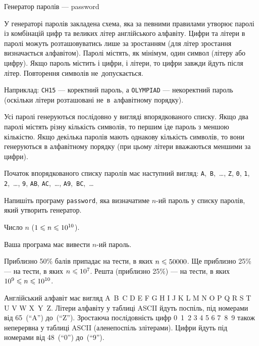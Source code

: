 \documentclass[14pt,a4paper]{extarticle}
\begin{document}
\begin{problemAllDefault}{Генератор паролів --- password}

У генераторі паролів закладена схема, яка за певними правилами утворює паролі із комбінацій цифр та великих літер англійського алфавіту. Цифри та літери в паролі можуть розташовуватись лише за зростанням (для літер зростання визначається алфавітом). Паролі містять, як мінімум, один символ (літеру або цифру). Якщо пароль містить і цифри, і літери, то цифри завжди йдуть після літер. Повторення символів не~допускається.

Наприклад: \texttt{CH15} --- коректний пароль, а \texttt{OLYMPIAD} --- некоректний пароль (оскільки літери розташовані не~в~алфавітному порядку).

Усі паролі генеруються послідовно у вигляді впорядкованого списку. Якщо два паролі містять різну кількість символів, то першим іде пароль з меншою кількістю. Якщо декілька паролів мають однакову кількість символів, то вони генеруються в алфавітному порядку (при цьому літери вважаються меншими за цифри).

Початок впорядкованого списку паролів має наступний вигляд: \texttt{A},~\texttt{B},~\dots, \texttt{Z}, \texttt{0}, \texttt{1}, \texttt{2},~\dots, \texttt{9}, \texttt{AB}, \texttt{AC},~\dots, \texttt{A9},~\texttt{BC},~\dots 

\Task Напишіть програму \texttt{password}, яка визначатиме $n$-ий пароль у списку паролів, який утворить генератор.

\InputFile Число $n$ ($1\leqslant n\leqslant10^{10}$).

\OutputFile Ваша програма має вивести $n$-ий пароль.

\Examples
\begin{exampleSimple}{2em}{2em}%
%
%
\end{exampleSimple}

\Scoring Приблизно 50\% балів припадає на тести, в яких $n\leqslant50000$. Ще приблизно 25\% --- на тести, в яких $n\leqslant10^7$. Решта (приблизно 25\%) --- на тести, в яких $10^9 \leqslant n \leqslant 10^{10}$.


\Note Англійський алфавіт має вигляд A~B~C D E F G H I J K L M N O P Q R S T U V W X~Y~Z. Літери алфавіту у таблиці ASCII йдуть поспіль, під номерами від 65~(``A'') до~(``Z''). Зростаюча послідовність цифр 0~1~2 3 4 5 6 7~8~9 також неперервна у таблиці ASCII (але\nolinebreak[3] не\nolinebreak[2] поспіль з\nolinebreak[3] літерами). Цифри йдуть під номерами від 48~(``0'') до~(``9'').


\end{problemAllDefault}
	
\end{document}
